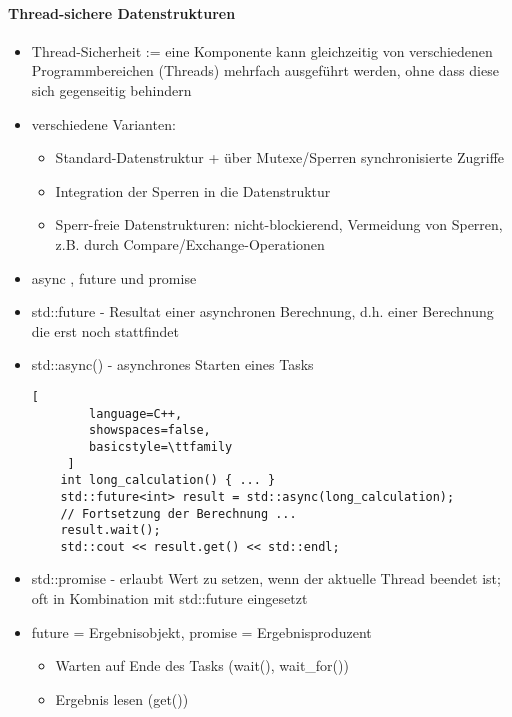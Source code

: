\documentclass[10pt]{article}
\begin{document}
\paragraph{Thread-sichere Datenstrukturen}
\begin{itemize}
  \item Thread-Sicherheit := eine Komponente kann gleichzeitig von verschiedenen Programmbereichen (Threads) mehrfach ausgeführt werden, ohne dass diese sich gegenseitig behindern
  \item verschiedene Varianten:
        \begin{itemize}
          \item Standard-Datenstruktur + über Mutexe/Sperren synchronisierte Zugriffe
          \item Integration der Sperren in die Datenstruktur
          \item Sperr-freie Datenstrukturen: nicht-blockierend, Vermeidung von Sperren, z.B. durch Compare/Exchange-Operationen
        \end{itemize}
  \item async , future und promise
  \item std::future - Resultat einer asynchronen Berechnung, d.h. einer Berechnung die erst noch stattfindet
  \item std::async() - asynchrones Starten eines Tasks
        \begin{lstlisting}[
        language=C++,
        showspaces=false,
        basicstyle=\ttfamily
     ]
    int long_calculation() { ... }
    std::future<int> result = std::async(long_calculation);
    // Fortsetzung der Berechnung ...
    result.wait();
    std::cout << result.get() << std::endl;
    \end{lstlisting}
  \item std::promise - erlaubt Wert zu setzen, wenn der aktuelle Thread beendet ist; oft in Kombination mit std::future eingesetzt
  \item future = Ergebnisobjekt, promise = Ergebnisproduzent
        \begin{itemize}
          \item Warten auf Ende des Tasks (wait(), wait\_for())
          \item Ergebnis lesen (get())
        \end{itemize}
\end{itemize}
\end{document}
